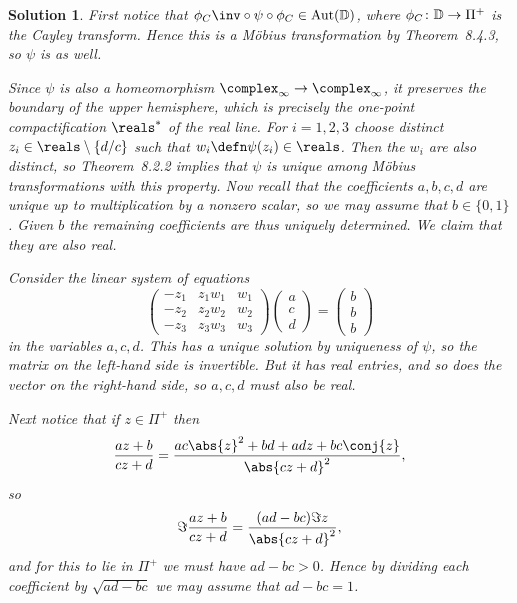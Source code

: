 \documentclass[article, a4paper, 11pt, oneside]{memoir}
\numberwithin{equation}{chapter}
\theoremstyle{nonumberplain}
\newtheorem{solution}{Solution}
\DeclareMathOperator{\Aut}{Aut}
\begin{document}
\begin{solution}
    First notice that $\phi_C\inv \circ \psi \circ \phi_C \in \Aut(\disk)$, where $\phi_C \colon \mathbb{D} \to \Pi^+$ is the Cayley transform. Hence this is a Möbius transformation by Theorem~8.4.3, so $\psi$ is as well.

    Since $\psi$ is also a homeomorphism $\complex_\infty \to \complex_\infty$, it preserves the boundary of the upper hemisphere, which is precisely the one-point compactification $\reals^*$ of the real line. For $i = 1,2,3$ choose distinct $z_i \in \reals \setminus \{d/c\}$ such that $w_i \defn \psi(z_i) \in \reals$. Then the $w_i$ are also distinct, so Theorem~8.2.2 implies that $\psi$ is unique among Möbius transformations with this property. Now recall that the coefficients $a,b,c,d$ are unique up to multiplication by a nonzero scalar, so we may assume that $b \in \{0,1\}$. Given $b$ the remaining coefficients are thus uniquely determined. We claim that they are also real.

    Consider the linear system of equations
    \begin{equation*}
        \begin{pmatrix}
            -z_1 & z_1 w_1 & w_1 \\
            -z_2 & z_2 w_2 & w_2 \\
            -z_3 & z_3 w_3 & w_3
        \end{pmatrix}
        \begin{pmatrix}
            a \\ c \\ d
        \end{pmatrix}
        =
        \begin{pmatrix}
            b \\ b \\ b
        \end{pmatrix}
    \end{equation*}
    in the variables $a,c,d$. This has a unique solution by uniqueness of $\psi$, so the matrix on the left-hand side is invertible. But it has real entries, and so does the vector on the right-hand side, so $a,c,d$ must also be real.

    Next notice that if $z \in \Pi^+$ then
    \begin{equation*}
        \frac{az + b}{cz + d}
            = \frac{ac \abs{z}^2 + bd + adz + bc\conj{z}}{\abs{cz + d}^2},
    \end{equation*}
    so
    \begin{equation*}
        \Im \frac{az + b}{cz + d}   
            = \frac{(ad-bc) \Im z}{\abs{cz + d}^2},
    \end{equation*}
    and for this to lie in $\Pi^+$ we must have $ad-bc > 0$. Hence by dividing each coefficient by $\sqrt{ad - bc}$ we may assume that $ad - bc = 1$.
    

\end{solution}
\end{document}

